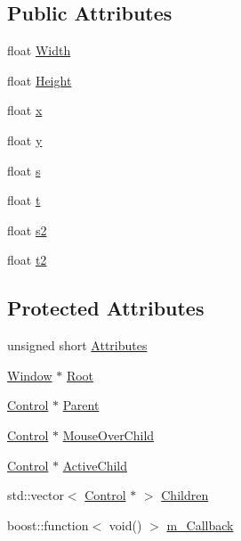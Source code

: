 \subsection*{Public Attributes}
\begin{CompactItemize}
\item 
float \hyperlink{class_control_a485c96e0ce271b1245ddd2d6bd79675}{Width}
\item 
float \hyperlink{class_control_f3d70c689cafd1dfe2313199e6a41293}{Height}
\item 
float \hyperlink{class_control_a73c00d4474d4eec453c5d8ccda1566d}{x}
\item 
float \hyperlink{class_control_f2d14a39b8112081f36876da68c1bf0e}{y}
\item 
float \hyperlink{class_control_caf55f6d777a0e64c18ccbd01c245ba1}{s}
\item 
float \hyperlink{class_control_d51b3671315b6be1c2ee5a449e5c8682}{t}
\item 
float \hyperlink{class_control_ddd155abd23b90ae592b2d781eba4fdb}{s2}
\item 
float \hyperlink{class_control_760fb4113b3bc7da97f90a2777b2f505}{t2}
\end{CompactItemize}
\subsection*{Protected Attributes}
\begin{CompactItemize}
\item 
unsigned short \hyperlink{class_control_4cc3fdb3e18ee7a3de58185681529778}{Attributes}
\item 
\hyperlink{class_window}{Window} $\ast$ \hyperlink{class_control_7bbeb54bfafb6f04b6cb6313c66d4d10}{Root}
\item 
\hyperlink{class_control}{Control} $\ast$ \hyperlink{class_control_8640e0ab6a79e5d6a65f8c0ae372cc5e}{Parent}
\item 
\hyperlink{class_control}{Control} $\ast$ \hyperlink{class_control_e0c10471d5ed6637afa9bd10b828016b}{MouseOverChild}
\item 
\hyperlink{class_control}{Control} $\ast$ \hyperlink{class_control_10aad05127f14123e168c4ff1c2803ba}{ActiveChild}
\item 
std::vector$<$ \hyperlink{class_control}{Control} $\ast$ $>$ \hyperlink{class_control_2de06adc1c35f408f8b7997324e9f8dd}{Children}
\item 
boost::function$<$ void() $>$ \hyperlink{class_control_8bb1b2b7c3a9c7ed2aabf992d0dbf544}{m\_\-Callback}
\end{CompactItemize}


